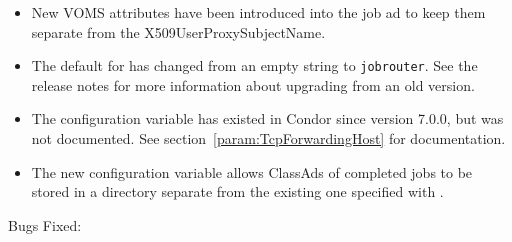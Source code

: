 \begin{itemize}

\item New VOMS attributes have been introduced into the job ad to keep them
separate from the X509UserProxySubjectName.

\item The default for  has changed from an
  empty string to \verb|jobrouter|.  See the release notes for more
  information about upgrading from an old version.

\item The configuration variable 
  has existed in Condor since version 7.0.0, but was not documented.
  See section~\ref{param:TcpForwardingHost} for documentation.

\item The new configuration variable 
allows ClassAds of completed jobs to be stored in a directory separate 
from the existing one specified with .

\end{itemize}

\noindent Bugs Fixed:

